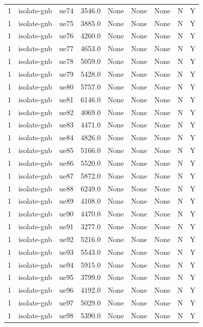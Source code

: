 \begin{table}[ht]
\begin{tabular}{|c|c|c|c|c|c|c|c|c|}
1 & isolate-gnb & ue74 & 3546.0 & None & None & None & N & Y \\
1 & isolate-gnb & ue75 & 3885.0 & None & None & None & N & Y \\
1 & isolate-gnb & ue76 & 4260.0 & None & None & None & N & Y \\
1 & isolate-gnb & ue77 & 4653.0 & None & None & None & N & Y \\
1 & isolate-gnb & ue78 & 5059.0 & None & None & None & N & Y \\
1 & isolate-gnb & ue79 & 5428.0 & None & None & None & N & Y \\
1 & isolate-gnb & ue80 & 5757.0 & None & None & None & N & Y \\
1 & isolate-gnb & ue81 & 6146.0 & None & None & None & N & Y \\
1 & isolate-gnb & ue82 & 4069.0 & None & None & None & N & Y \\
1 & isolate-gnb & ue83 & 4471.0 & None & None & None & N & Y \\
1 & isolate-gnb & ue84 & 4826.0 & None & None & None & N & Y \\
1 & isolate-gnb & ue85 & 5166.0 & None & None & None & N & Y \\
1 & isolate-gnb & ue86 & 5520.0 & None & None & None & N & Y \\
1 & isolate-gnb & ue87 & 5872.0 & None & None & None & N & Y \\
1 & isolate-gnb & ue88 & 6249.0 & None & None & None & N & Y \\
1 & isolate-gnb & ue89 & 4108.0 & None & None & None & N & Y \\
1 & isolate-gnb & ue90 & 4470.0 & None & None & None & N & Y \\
1 & isolate-gnb & ue91 & 3277.0 & None & None & None & N & Y \\
1 & isolate-gnb & ue92 & 5216.0 & None & None & None & N & Y \\
1 & isolate-gnb & ue93 & 5543.0 & None & None & None & N & Y \\
1 & isolate-gnb & ue94 & 5915.0 & None & None & None & N & Y \\
1 & isolate-gnb & ue95 & 3799.0 & None & None & None & N & Y \\
1 & isolate-gnb & ue96 & 4192.0 & None & None & None & N & Y \\
1 & isolate-gnb & ue97 & 5029.0 & None & None & None & N & Y \\
1 & isolate-gnb & ue98 & 5390.0 & None & None & None & N & Y \\

\end{tabular}
\end{table}
